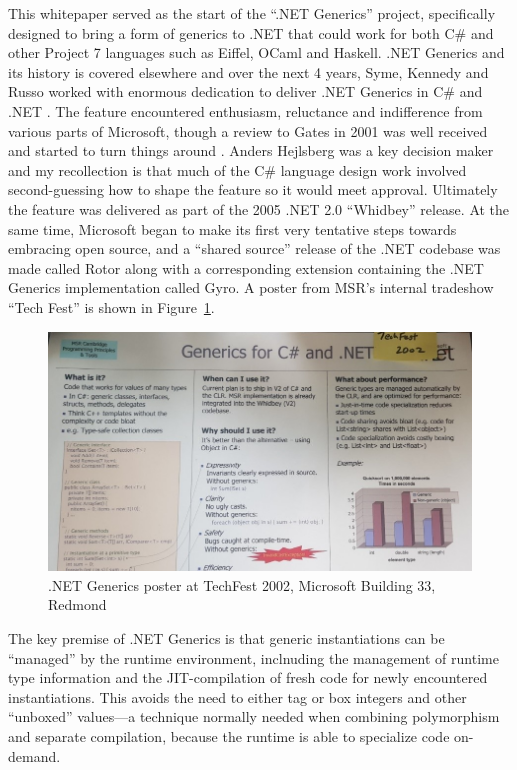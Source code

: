 \documentclass[acmsmall,screen]{acmart}
\begin{document}
This whitepaper served as the start of the “.NET Generics” project, specifically designed to bring a form of generics to .NET that could work for both C\# and other
Project 7 languages such as Eiffel, OCaml and Haskell. .NET Generics and its history is covered elsewhere \citep{RefWarren} and over the next 4 years, Syme, Kennedy and Russo worked with
enormous dedication to deliver .NET Generics in C\# and .NET \citep{Kennedy2001}. The feature encountered enthusiasm, reluctance and indifference from
various parts of Microsoft, though a review to Gates in 2001 was well received and started to turn things around \citep{RefGatesReview}.   Anders Hejlsberg
was a key decision maker and my recollection is that much of the C\# language design work involved second-guessing how to shape the feature so it would meet approval. Ultimately the feature was
delivered as part of the 2005 .NET 2.0 “Whidbey” release.  At the same time, Microsoft began to make its first very tentative steps towards embracing open
source, and a “shared source” release of the .NET codebase was made called Rotor along with a corresponding extension containing the .NET Generics implementation
called Gyro.  A poster from MSR’s internal tradeshow “Tech Fest” is shown in Figure~\ref{fig:fig1}. 

\begin{figure}

  \includegraphics[width=0.8\linewidth]{fig1.jpg}
  \caption{.NET Generics poster at TechFest 2002, Microsoft Building 33, Redmond}
  \label{fig:fig1}
\end{figure}

The key premise of .NET Generics is that generic instantiations can be “managed” by the runtime environment, inclnuding the management of runtime type information
and the JIT-compilation of fresh code for newly encountered instantiations.  This avoids the need to either tag or box integers and other “unboxed” values---a technique
normally needed when combining polymorphism and separate compilation, because the runtime is able to specialize code on-demand.
\end{document}
